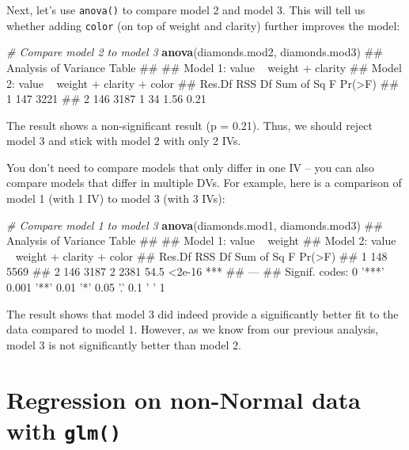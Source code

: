 \documentclass[]{book}
\newenvironment{Shaded}{\begin{snugshade}}{\end{snugshade}}
\newcommand{\KeywordTok}[1]{\textcolor[rgb]{0.13,0.29,0.53}{\textbf{#1}}}
\newcommand{\CommentTok}[1]{\textcolor[rgb]{0.56,0.35,0.01}{\textit{#1}}}
\newcommand{\NormalTok}[1]{#1}
\theoremstyle{definition}
\theoremstyle{definition}
\theoremstyle{remark}
\begin{document}
Next, let's use \texttt{anova()} to compare model 2 and model 3. This
will tell us whether adding \texttt{color} (on top of weight and
clarity) further improves the model:

\begin{Shaded}
\begin{Highlighting}[]
\CommentTok{# Compare model 2 to model 3}
\KeywordTok{anova}\NormalTok{(diamonds.mod2, diamonds.mod3)}
\NormalTok{## Analysis of Variance Table}
\NormalTok{## }
\NormalTok{## Model 1: value ~ weight + clarity}
\NormalTok{## Model 2: value ~ weight + clarity + color}
\NormalTok{##   Res.Df  RSS Df Sum of Sq    F Pr(>F)}
\NormalTok{## 1    147 3221                         }
\NormalTok{## 2    146 3187  1        34 1.56   0.21}
\end{Highlighting}
\end{Shaded}

The result shows a non-significant result (p = 0.21). Thus, we should
reject model 3 and stick with model 2 with only 2 IVs.

You don't need to compare models that only differ in one IV -- you can
also compare models that differ in multiple DVs. For example, here is a
comparison of model 1 (with 1 IV) to model 3 (with 3 IVs):

\begin{Shaded}
\begin{Highlighting}[]
\CommentTok{# Compare model 1 to model 3}
\KeywordTok{anova}\NormalTok{(diamonds.mod1, diamonds.mod3)}
\NormalTok{## Analysis of Variance Table}
\NormalTok{## }
\NormalTok{## Model 1: value ~ weight}
\NormalTok{## Model 2: value ~ weight + clarity + color}
\NormalTok{##   Res.Df  RSS Df Sum of Sq    F Pr(>F)    }
\NormalTok{## 1    148 5569                             }
\NormalTok{## 2    146 3187  2      2381 54.5 <2e-16 ***}
\NormalTok{## ---}
\NormalTok{## Signif. codes:  0 '***' 0.001 '**' 0.01 '*' 0.05 '.' 0.1 ' ' 1}
\end{Highlighting}
\end{Shaded}

The result shows that model 3 did indeed provide a significantly better
fit to the data compared to model 1. However, as we know from our
previous analysis, model 3 is not significantly better than model 2.

\section{\texorpdfstring{Regression on non-Normal data with
\texttt{glm()}}{Regression on non-Normal data with glm()}}\label{regression-on-non-normal-data-with-glm}
\end{document}
